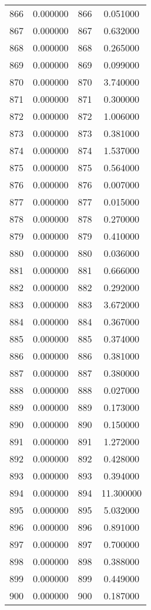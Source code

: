 \documentclass[12pt]{article}
\begin{document}
\begin{longtable}{@{}cccc@{}}
866 & 0.000000 & 866 & 0.051000 \\
867 & 0.000000 & 867 & 0.632000 \\
868 & 0.000000 & 868 & 0.265000 \\
869 & 0.000000 & 869 & 0.099000 \\
870 & 0.000000 & 870 & 3.740000 \\
871 & 0.000000 & 871 & 0.300000 \\
872 & 0.000000 & 872 & 1.006000 \\
873 & 0.000000 & 873 & 0.381000 \\
874 & 0.000000 & 874 & 1.537000 \\
875 & 0.000000 & 875 & 0.564000 \\
876 & 0.000000 & 876 & 0.007000 \\
877 & 0.000000 & 877 & 0.015000 \\
878 & 0.000000 & 878 & 0.270000 \\
879 & 0.000000 & 879 & 0.410000 \\
880 & 0.000000 & 880 & 0.036000 \\
881 & 0.000000 & 881 & 0.666000 \\
882 & 0.000000 & 882 & 0.292000 \\
883 & 0.000000 & 883 & 3.672000 \\
884 & 0.000000 & 884 & 0.367000 \\
885 & 0.000000 & 885 & 0.374000 \\
886 & 0.000000 & 886 & 0.381000 \\
887 & 0.000000 & 887 & 0.380000 \\
888 & 0.000000 & 888 & 0.027000 \\
889 & 0.000000 & 889 & 0.173000 \\
890 & 0.000000 & 890 & 0.150000 \\
891 & 0.000000 & 891 & 1.272000 \\
892 & 0.000000 & 892 & 0.428000 \\
893 & 0.000000 & 893 & 0.394000 \\
894 & 0.000000 & 894 & 11.300000 \\
895 & 0.000000 & 895 & 5.032000 \\
896 & 0.000000 & 896 & 0.891000 \\
897 & 0.000000 & 897 & 0.700000 \\
898 & 0.000000 & 898 & 0.388000 \\
899 & 0.000000 & 899 & 0.449000 \\
900 & 0.000000 & 900 & 0.187000 \\

\end{longtable}
\end{document}
